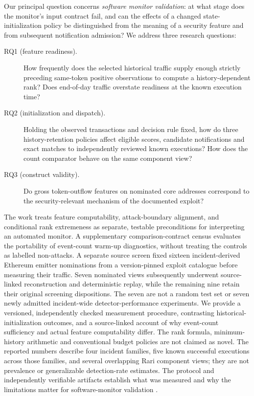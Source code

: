 \documentclass[preprint,12pt,authoryear]{elsarticle}
\begin{document}
Our principal question concerns \emph{software monitor validation}: at what stage does the monitor's input contract fail, and can the effects of a changed state-initialization policy be distinguished from the meaning of a security feature and from subsequent notification admission? We address three research questions:

\begin{description}
\item[RQ1 (feature readiness).] How frequently does the selected historical traffic supply enough strictly preceding same-token positive observations to compute a history-dependent rank? Does end-of-day traffic overstate readiness at the known execution time?
\item[RQ2 (initialization and dispatch).] Holding the observed transactions and decision rule fixed, how do three history-retention policies affect eligible scores, candidate notifications and exact matches to independently reviewed known executions? How does the count comparator behave on the same component view?
\item[RQ3 (construct validity).] Do gross token-outflow features on nominated core addresses correspond to the security-relevant mechanism of the documented exploit?
\end{description}

The work treats feature computability, attack-boundary alignment, and conditional rank extremeness as separate, testable preconditions for interpreting an automated monitor. A supplementary comparison-contract census evaluates the portability of event-count warm-up diagnostics, without treating the controls as labelled non-attacks. A separate source screen fixed sixteen incident-derived Ethereum emitter nominations from a version-pinned exploit catalogue before measuring their traffic. Seven nominated views subsequently underwent source-linked reconstruction and deterministic replay, while the remaining nine retain their original screening dispositions. The seven are not a random test set or seven newly admitted incident-wide detector-performance experiments. We provide a versioned, independently checked measurement procedure, contrasting historical-initialization outcomes, and a source-linked account of why event-count sufficiency and actual feature computability differ. The rank formula, minimum-history arithmetic and conventional budget policies are not claimed as novel. The reported numbers describe four incident families, five known successful executions across those families, and several overlapping Rari component views; they are not prevalence or generalizable detection-rate estimates. The protocol and independently verifiable artifacts establish what was measured and why the limitations matter for software-monitor validation \citep{Kitchenham2004Evidence,Wohlin2012Experimentation}.
\end{document}
